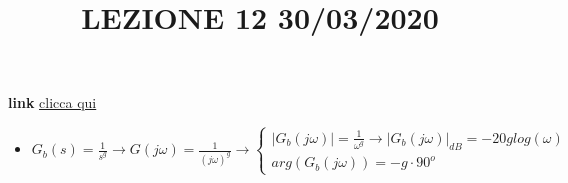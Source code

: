 \title{LEZIONE 12 30/03/2020}\newline
\textbf{link} \href{https://web.microsoftstream.com/video/22a546ac-3e6b-43e0-b0f9-45a630661700?list=user&userId=faa91214-a6f5-40d7-8875-253fd49b8ce1}{clicca qui}
\begin{itemize}
    \item $G_b(s)= \frac{1}{s^g} \rightarrow G(j \omega) = \frac{1}{(j \omega)^g} \rightarrow \begin{cases}
        |G_b(j \omega)| = \frac{1}{\omega^g} \rightarrow |G_b(j \omega)|_{dB}= - 20 g log(\omega)\\
        arg(G_b(j \omega)) = - g \cdot 90^o
    \end{cases} $
\end{itemize}